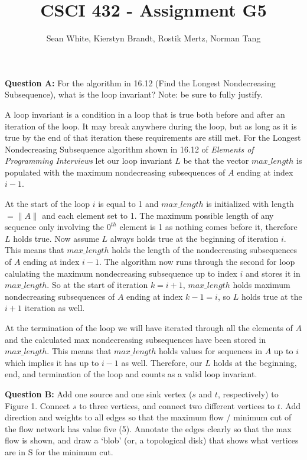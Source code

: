 \documentclass[12pt]{article}
\author{Sean White, Kierstyn Brandt, Rostik Mertz, Norman Tang}
\title{CSCI 432 - Assignment G5}
\begin{document}
\maketitle

\noindent
\textbf{Question A:} For the algorithm in 16.12 (Find the Longest Nondecreasing Subsequence), what is the loop invariant? Note: be sure to fully justify. \smallskip

A loop invariant is a condition in a loop that is true both before and after an iteration of the loop. It may break anywhere during the loop, but as long as it is true by the end of that iteration these requirements are still met. For the Longest Nondecreasing Subsequence algorithm shown in 16.12 of \textit{Elements of Programming Interviews} let our loop invariant $L$ be that the vector $max\_length$ is populated with the maximum nondecreasing subsequences of $A$ ending at index $i - 1$. 

At the start of the loop $i$ is equal to 1 and $max\_length$ is initialized with length $= \|A\|$ and each element set to 1. The maximum possible length of any sequence only involving the $0^{th}$ element is 1 as nothing comes before it, therefore $L$ holds true. Now assume $L$ always holds true at the beginning of iteration $i$. This means that $max\_length$ holds the length of the nondecreasing subsequences of $A$ ending at index $i - 1$. The algorithm now runs through the second for loop calulating the maximum nondecreasing subsequence up to index $i$ and stores it in $max\_length$. So at the start of iteration $k = i + 1$, $max\_length$ holds maximum nondecreasing subsequences of $A$ ending at index $k - 1 = i$, so $L$ holds true at the $i + 1$ iteration as well.

At the termination of the loop we will have iterated through all the elements of $A$ and the calculated max nondecreasing subsequences have been stored in $max\_length$. This means that $max\_length$ holds values for sequences in $A$ up to $i$ which implies it has up to $i-1$ as well. Therefore, our $L$ holds at the beginning, end, and termination of the loop and counts as a valid loop invariant.


\pagebreak
\noindent
\textbf{Question B:} Add one source and one sink vertex ($s$ and $t$, respectively) to Figure 1. Connect $s$ to three vertices, and connect two different vertices to $t$. Add direction and weights to all edges so that the maximum flow / minimum cut of the flow network has value five (5). Annotate the edges clearly so that the max flow is shown, and draw a ‘blob’ (or, a topological disk) that shows what vertices are in S for the minimum cut. \smallskip
\end{document}
